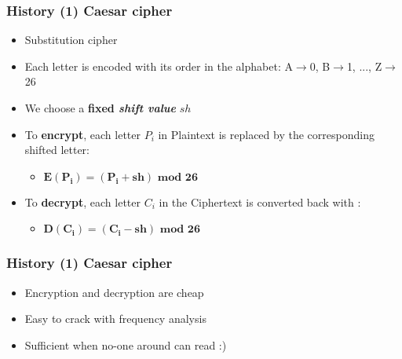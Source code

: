 \documentclass[
hyperref={pdfpagelabels=false}
,xcolor=table
]
{beamer}
\newcommand{\plus}{{\texttt{[image: plus.png]}}}
\newcommand{\minus}{{\texttt{[image: minus.png]}}}
\begin{document}
\begin{frame}
  \frametitle{History (1) Caesar cipher}

  \begin{itemize}
  \item Substitution cipher
  \item Each letter is encoded with its order in the alphabet: A$\rightarrow$0, B$\rightarrow$1, ..., Z$\rightarrow$26
  \item We choose a \textbf{fixed \textit{shift value}} $sh$
  \item To \textbf{encrypt}, each letter $P_i$ in Plaintext is replaced by the corresponding shifted letter:
    \begin{itemize}
    \item[] $\bm{E(P_i) = (P_i + sh) \mbox{ mod } 26}$
    \end{itemize}
  \item To \textbf{decrypt}, each letter $C_i$ in the Ciphertext is converted back with :
    \begin{itemize}
    \item[] $\bm{D(C_i) = (C_i - sh) \mbox{ mod } 26}$ 
    \end{itemize}
  \end{itemize}

  
\end{frame}



\begin{frame}
  \frametitle{History (1) Caesar cipher}
 
  \begin{itemize}
  \item[\plus] Encryption and decryption are cheap
  \item[\minus] Easy to crack with frequency analysis
  \item[\minus] Sufficient when no-one around can read :) 
  \end{itemize}
\end{frame}
\end{document}
